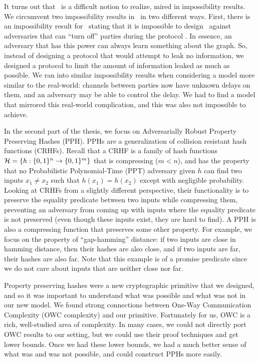 It turns out that \THC~is a difficult notion to realize, mired in impossibility results.
We circumvent two impossibility results in \THC~in two different ways. First, there is an impossibility result for \THC~stating that it is impossible to design \THC~against adversaries that can ``turn off'' parties during the protocol \cite{MOR15}. In essence, an adversary that has this power can always learn something about the graph. So, instead of designing a protocol that would attempt to leak no information, we designed a protocol to limit the amount of information leaked as much as possible. We ran into similar impossibility results when considering a model more similar to the real-world: channels between parties now have unknown delays on them, and an adversary may be able to control the delay. We had to find a model that mirrored this real-world complication, and this was also not impossible to achieve.

In the second part of the thesis, we focus on Adversarially Robust Property Preserving Hashes (PPH).
PPHs are a generalization of collision resistant hash functions (CRHFs). Recall that a CRHF is a family of hash functions ${\cal H} = \{ h:\{0,1\}^n \to \{0,1\}^m \}$ that is compressing ($m < n$), and has the property that no Probabilistic Polynomial-Time (PPT) adversary given $h$ can find two inputs $x_1 \neq x_2$ such that $h(x_1) = h(x_2)$ except with negligible probability. Looking at CRHFs from a slightly different perspective, their functionality is to preserve the equality predicate between two inputs while compressing them, preventing an adversary from coming up with inputs where the equality predicate is not preserved  (even though these inputs exist, they are hard to find). A PPH is also a compressing function that preserves some other property. For example, we focus on the property of ``gap-hamming'' distance: if two inputs are close in hamming distance, then their hashes are also close, and if two inputs are far, their hashes are also far. Note that this example is of a promise predicate since we do not care about inputs that are neither close nor far.

Property preserving hashes were a new cryptographic primitive that we designed, and so it was important to understand what was possible and what was not in our new model. We found strong connections between One-Way Communication Complexity (OWC complexity) and our primitive. Fortunately for us, OWC is a rich, well-studied area of complexity. In many cases, we could not directly port OWC results to our setting, but we could use their proof techniques and get lower bounds. Once we had these lower bounds, we had a much better sense of what was and was not possible, and could construct PPHs more easily.

